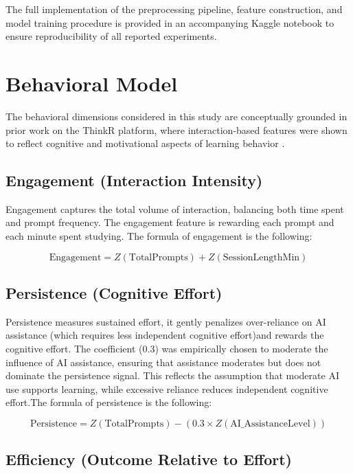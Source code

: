 \documentclass{article}
\begin{document}
The full implementation of the preprocessing pipeline, feature construction, and model training procedure is provided in an accompanying Kaggle notebook to ensure reproducibility of all reported experiments.

\section{Behavioral Model}

The behavioral dimensions considered in this study are conceptually grounded in prior work on the ThinkR platform, where interaction-based features were shown to reflect cognitive and motivational aspects of learning behavior \cite{penrose_article}.

\subsection{Engagement (Interaction Intensity)}

Engagement captures the total volume of interaction, balancing both time spent and prompt frequency. The engagement feature is rewarding each prompt and each minute spent studying. The formula of engagement is the following:

    \[
    \text{Engagement} = Z(\text{TotalPrompts}) + Z(\text{SessionLengthMin})
    \]

\subsection{Persistence (Cognitive Effort)}

Persistence measures sustained effort, it gently penalizes over-reliance on AI assistance (which requires less independent cognitive effort)and rewards the cognitive effort. The coefficient (0.3) was empirically chosen to moderate the influence of AI assistance, ensuring that assistance moderates but does not dominate the persistence signal. This reflects the assumption that moderate AI use supports learning, while excessive reliance reduces independent cognitive effort.The formula of persistence is the following:

    \[
    \text{Persistence} = Z(\text{TotalPrompts}) - (0.3 \times Z(\text{AI\_AssistanceLevel}))
    \]

\subsection{Efficiency (Outcome Relative to Effort)}
\end{document}
